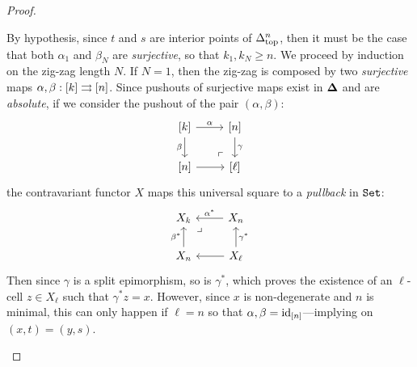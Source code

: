 \begin{proof}
\begin{itemize}
  By hypothesis, since \(t\) and \(s\) are interior points of \(\Delta_{\text{top}}^n\), then
  it must be the case that both \(\alpha_1\) and \(\beta_N\) are
  \emph{surjective}, so that \(k_1, k_N \geq n\). We proceed by induction on the
  zig-zag length \(N\). If \(N = 1\), then the zig-zag is composed by two
  \emph{surjective} maps \(\alpha, \beta: [k] \rightrightarrows [n]\). Since pushouts of
  surjective maps exist in \({\mathbf{\Delta}}\) and are \emph{absolute}, if we consider the
  pushout of the pair \((\alpha, \beta)\):
  \[
  \begin{tikzcd}
  {[k]} \ar[r, "\alpha"]
  \ar[d, "\beta"']
  \ar[rd, phantom, "\ulcorner", very near end]
  &{[n]} \ar[d, "\gamma"] \\
  {[n]} \ar[r] &{[\ell]}
  \end{tikzcd}
  \]
  the contravariant functor \(X\) maps this universal square to a
  \emph{pullback} in \({\texttt{Set}}\):
  \[
  \begin{tikzcd}
  X_k \ar[rd, "\lrcorner", very near start, phantom]
  &X_n \ar[l, "\alpha^{*}"'] \\
  X_n \ar[u, "\beta^{*}"]
  &X_{\ell} \ar[u, "\gamma^{*}"'] \ar[l]
  \end{tikzcd}
  \]
  Then since \(\gamma\) is a split epimorphism, so is \(\gamma^{*}\), which
  proves the existence of an \(\ell\)-cell \(z \in X_{\ell}\) such that
  \(\gamma^{*} z = x\). However, since \(x\) is non-degenerate and \(n\) is
  minimal, this can only happen if \(\ell = n\) so that \(\alpha, \beta =
  \operatorname{id}_{[n]}\)---implying on \((x, t) = (y, s)\).


\end{itemize}
\end{proof}
